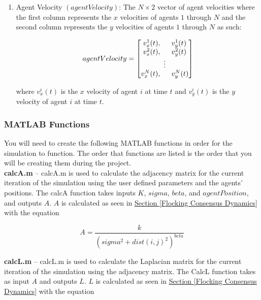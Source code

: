 \documentclass[../CourseManual.tex]{subfiles}
\begin{document}
\begin{enumerate}
    \item Agent Velocity $(agentVelocity)$: The $N \times 2$ vector of agent velocities where the first column represents the $x$ velocities of agents $1$ through $N$ and the second column represents the $y$ velocities of agents $1$ through $N$ as such:
    
    $$agentVelocity = 
    \begin{bmatrix}
    v^{1}_{x}(t), \hspace{0.5cm} v^{1}_{y}(t) \\
    v^{2}_{x}(t), \hspace{0.5cm} v^{2}_{y}(t) \\
    \vdots \\
    v^{N}_{x}(t), \hspace{0.5cm} v^{N}_{y}(t) \\
    \end{bmatrix}$$
    
    where $v^{i}_{x}(t)$ is the $x$ velocity of agent $i$ at time $t$ and $v^{i}_{y}(t)$ is the $y$ velocity of agent $i$ at time $t$.
    
\end{enumerate}

\subsubsection{MATLAB Functions} \label{MATLAB Functions: Flocking}
You will need to create the following MATLAB functions in order for the simulation to function. The order that functions are listed is the order that you will be creating them during the project.\\

\textbf{calcA.m} -- calcA.m is used to calculate the adjacency matrix for the current iteration of the simulation using the user defined parameters and the agents' positions. The calcA function takes inputs $K$, $sigma$, $beta$, and $agentPosition$, and outputs $A$. $A$ is calculated as seen in \hyperref[Flocking Consensus Dynamics]{Section \ref{Flocking Consensus Dynamics}} with the equation

$$A = \dfrac{k}{(sigma^2 + dist(i,j)^2)^{beta}}$$

\textbf{calcL.m} -- calcL.m is used to calculate the Laplacian matrix for the current iteration of the simulation using the adjacency matrix. The CalcL function takes as input $A$ and outputs $L$. $L$ is calculated as seen in \hyperref[Flocking Consensus Dynamics]{Section \ref{Flocking Consensus Dynamics}} with the equation 
\end{document}
